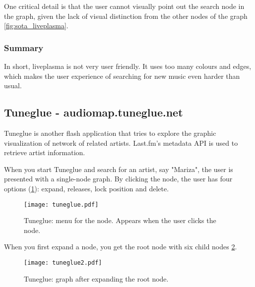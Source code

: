 One critical detail is that the user cannot visually point out the search node in the graph, given the lack of visual distinction from the other nodes of the graph \ref{fig:sota_liveplasma}.



\subsubsection{Summary} %
\label{ssub:liveplasma_summary}

In short, liveplasma is not very user friendly. 
It uses too many colours and edges, which makes the user experience of searching for new music even harder than usual.



\subsection{Tuneglue - audiomap.tuneglue.net} %
\label{sub:tuneglue}

Tuneglue is another flash application that tries to explore the graphic visualization of network of related artists.
Last.fm's metadata API is used to retrieve artist information.

When you start Tuneglue and search for an artist, say "Mariza", the user is presented with a single-node graph.
By clicking the node, the user has four options (\ref{fig:sota_tuneglue}): expand, releases, lock position and delete.


\begin{figure}[bt]
  \begin{center}
    \texttt{[image: tuneglue.pdf]}
  \end{center}
  \caption{Tuneglue: menu for the node. Appears when the user clicks the node.}
  \label{fig:sota_tuneglue}
\end{figure}

When you first expand a node, you get the root node with six child nodes \ref{fig:sota_tuneglue2}.

\begin{figure}[tb]
  \begin{center}
    \texttt{[image: tuneglue2.pdf]}
  \end{center}
  \caption{Tuneglue: graph after expanding the root node.}
  \label{fig:sota_tuneglue2}
\end{figure}

